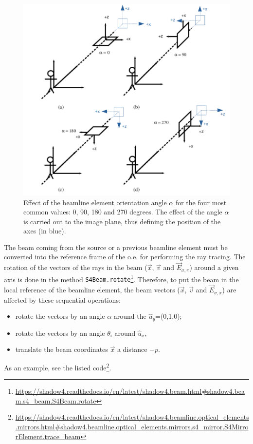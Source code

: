 \documentclass{iucr}
\begin{document}
\begin{figure}
\label{fig:S4_orientations}
    \centering
\includegraphics[width=0.9\linewidth]{figures/S4_orientations.png}
\caption{Effect of the beamline element orientation angle $\alpha$ for the four most common values: 0, 90, 180 and 270 degrees. The effect of the angle $\alpha$ is carried out to the image plane, thus defining the position of the axes (in blue). }  
\end{figure}


The beam coming from the source or a previous beamline element must be converted into the reference frame of the o.e. for performing the ray tracing.
The rotation of the vectors of the rays in the beam ($\vec{x}$, $\vec{v}$ and $\vec{E}_{\sigma,\pi}$) around a given axis is done in the method {\tt S4Beam.rotate}\footnote{\tiny \url{https://shadow4.readthedocs.io/en/latest/shadow4.beam.html#shadow4.beam.s4_beam.S4Beam.rotate}}. 
Therefore, to put the beam in the local reference of the beamline element, the beam vectors ($\vec{x}$,  $\vec{v}$ and $\vec{E}_{\sigma,\pi}$) are affected by these sequential operations:
\begin{itemize}
    \item rotate the vectors by an angle $\alpha$ around the $\hat{u}_y$=(0,1,0); 
    \item rotate the vectors by an angle $\theta_i$ around $\hat{u}_x$,
    \item translate the beam coordinates $\vec{x}$ a distance $-p$.
\end{itemize}
As an example, see the listed code\footnote{\tiny \url{https://shadow4.readthedocs.io/en/latest/shadow4.beamline.optical_elements.mirrors.html#shadow4.beamline.optical_elements.mirrors.s4_mirror.S4MirrorElement.trace_beam}}.
\end{document}
